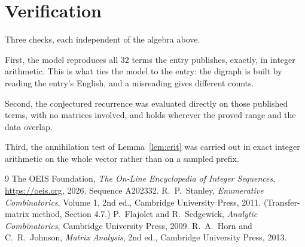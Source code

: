 \documentclass[11pt,a4paper]{article}
\theoremstyle{plain}
\theoremstyle{definition}
\begin{document}
\section{Verification}

Three checks, each independent of the algebra above.

First, the model reproduces all $32$ terms the entry publishes, exactly, in integer
arithmetic. This is what ties the model to the entry: the digraph is built by reading the
entry's English, and a misreading gives different counts.

Second, the conjectured recurrence was evaluated directly on those published terms, with no
matrices involved, and holds wherever the proved range and the data overlap.

Third, the annihilation test of Lemma~\ref{lem:crit} was carried out in exact integer
arithmetic on the whole vector rather than on a sampled prefix.

\begin{thebibliography}{9}
 The OEIS Foundation, \emph{The On-Line Encyclopedia of Integer
Sequences}, \url{https://oeis.org}, 2026. Sequence A202332.
 R.~P.~Stanley, \emph{Enumerative Combinatorics}, Volume 1, 2nd ed.,
Cambridge University Press, 2011. (Transfer-matrix method, Section 4.7.)
 P.~Flajolet and R.~Sedgewick, \emph{Analytic Combinatorics}, Cambridge
University Press, 2009.
 R.~A.~Horn and C.~R.~Johnson, \emph{Matrix Analysis}, 2nd ed., Cambridge
University Press, 2013.
\end{thebibliography}
\end{document}

